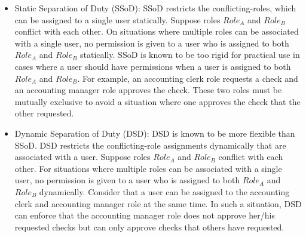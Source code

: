 \begin{itemize}
\item Static Separation of Duty (SSoD): SSoD restricts the conflicting-roles, which can be assigned to a single user statically. 
Suppose roles $Role_A$ and $Role_B$ conflict with each other. On situations where multiple roles can be associated with a single user, no permission is given to a user who is assigned to both $Role_A$ and $Role_B$ statically. 
SSoD is known to be too rigid for practical use in cases where a user should have permissions when a user is assigned to both $Role_A$ and $Role_B$. 
For example, an accounting clerk role requests a check and an accounting manager role approves the check. 
These two roles must be mutually exclusive to avoid a situation where one approves the check that the other requested.
	
\item Dynamic Separation of Duty (DSD): DSD is known to be more flexible than SSoD. 
DSD restricts the conflicting-role assignments dynamically that are associated with a user. 
Suppose roles $Role_A$ and $Role_B$ conflict with each other. 
For situations where multiple roles can be associated with a single user, no permission is given to a user who is assigned to both $Role_A$ and $Role_B$ dynamically.	
Consider that a user can be assigned to the accounting clerk and accounting manager role at the same time.
In such a situation, DSD can enforce that the accounting manager role does not approve her/his requested checks but can only approve checks that others have requested.
\end{itemize}

